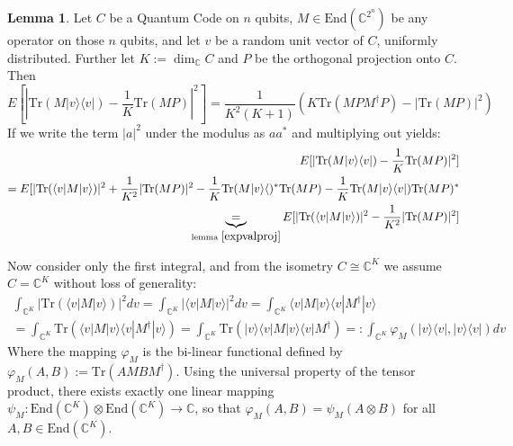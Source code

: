 \documentclass{article}
\def\C{\mathbb{C}}
\def\End{\text{End}}
\def\Tr{\text{Tr}}
\theoremstyle{definition}
\newtheorem{lem}[Satz]{Lemma}
\begin{document}
\begin{lem}\label{expvalvec}
Let $C$ be a Quantum Code on $n$ qubits, $M \in \End(\C^{2^n})$ be any operator on those $n$ qubits, and let $v$ be a random unit vector of $C$, uniformly distributed. Further let $K:= \dim_\C C$ and $P$ be the orthogonal projection onto $C$. Then
\begin{equation} E[|\Tr(M|v\rangle \langle v|) - \frac{1}{K}\Tr(MP)|^2] = \frac{1}{K^2(K+1)}(K \Tr(MPM^\dagger P) - |\Tr(MP)|^2) \end{equation}
If we write the term $|a|^2$ under the modulus as $a a^*$ and multiplying out yields:
\begin{align*}
E[|\Tr(M|v\rangle \langle v|) - \frac{1}{K}\Tr(MP)|^2] \\ = E[ |\Tr(\langle v | M | v \rangle )|^2 + \frac{1}{K^2} | \Tr(MP)|^2 - \frac{1}{K} \Tr(M |v \rangle \langle)^* \Tr(MP) - \frac{1}{K} \Tr(M |v\rangle \langle v|) \Tr(MP)^* \\
\underbrace{=}_{\text{lemma }\ref{expvalproj}} E[|\Tr( \langle v|M|v\rangle)|^2 - \frac{1}{K^2}|\Tr(MP)|^2]
\end{align*}

Now consider only the first integral, and from the isometry $C \cong \C^K$ we assume $C = \C^K$ without loss of generality: 
\begin{align*}
\int_{\C^K} |\Tr( \langle v|M|v\rangle)|^2 dv = \int_{\C^K} |\langle v|M|v\rangle|^2 dv =  \int_{\C^K} \langle v|M|v\rangle  \langle v|M^\dagger |v\rangle \\
 =  \int_{\C^K} \Tr (\langle v|M|v\rangle  \langle v|M^\dagger |v\rangle ) =  \int_{\C^K} \Tr(|v \rangle \langle v|M|v\rangle  \langle v|M^\dagger) =: \int_{\C^K} \varphi_M(|v \rangle \langle v|,|v \rangle \langle v|) dv
\end{align*}
Where the mapping $\varphi_M$ is the bi-linear functional defined by $\varphi_M(A,B):= \Tr(AMBM^\dagger)$. Using the universal property of the tensor product, there exists exactly one linear mapping $\psi_M: \End(\C^K) \otimes \End(\C^K) \rightarrow \C$, so that
$\varphi_M(A,B) = \psi_M(A \otimes B)$ for all $A, B \in \End(\C^K)$.


\end{lem}
\end{document}
